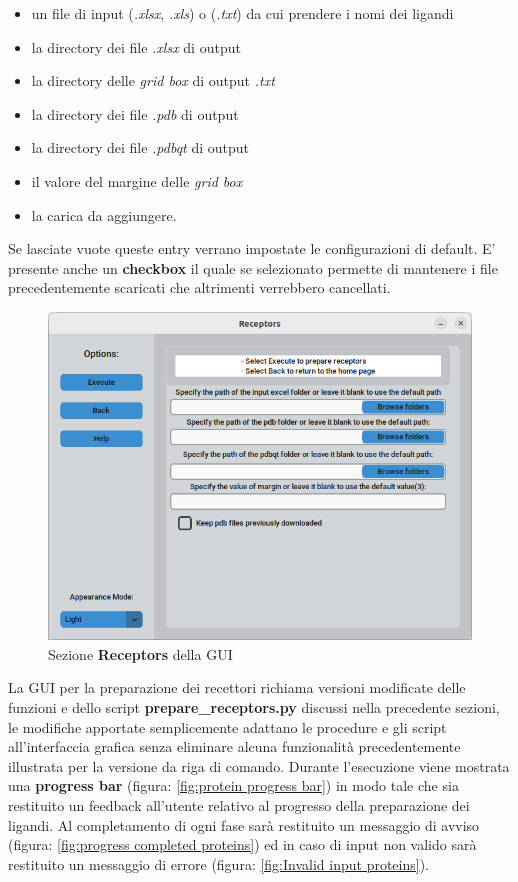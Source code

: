 \begin{itemize}
    \item un file di input (\textit{.xlsx}, \textit{.xls}) o (\textit{.txt}) da cui prendere i nomi dei ligandi
    \item la directory dei file \textit{.xlsx} di output
    \item la directory delle \textit{grid box} di output \textit{.txt}
    \item la directory dei file \textit{.pdb} di output
    \item la directory dei file \textit{.pdbqt} di output
    \item il valore del margine delle \textit{grid box}
    \item la carica da aggiungere.
\end{itemize}

Se lasciate vuote queste entry verrano impostate le configurazioni di default. E' presente anche un \textbf{checkbox} il quale se selezionato permette di mantenere i file precedentemente scaricati che altrimenti verrebbero cancellati.\newline

\begin{figure}[H]
    \centering
    \includegraphics[scale=0.6]{immagini/receptors.png}
    \caption{Sezione \textbf{Receptors} della GUI}
    \label{fig:receptors}
\end{figure}

La GUI per la preparazione dei recettori richiama versioni modificate delle funzioni e dello script \textbf{prepare\_receptors.py} discussi nella precedente sezioni, le modifiche apportate semplicemente adattano le procedure e gli script all'interfaccia grafica senza eliminare alcuna funzionalità precedentemente illustrata per la versione da riga di comando.\newline
Durante l'esecuzione viene mostrata una \textbf{progress bar} (figura: \ref{fig:protein progress bar}) in modo tale che sia restituito un feedback all'utente relativo al progresso della preparazione dei ligandi. Al completamento di ogni fase sarà restituito un messaggio di avviso (figura: \ref{fig:progress completed proteins}) ed in caso di input non valido sarà restituito un messaggio di errore (figura: \ref{fig:Invalid input proteins}).

